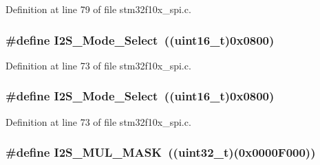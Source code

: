 Definition at line 79 of file stm32f10x\+\_\+spi.\+c.

\subsubsection[{\texorpdfstring{I2\+S\+\_\+\+Mode\+\_\+\+Select}{I2S_Mode_Select}}]{\setlength{\rightskip}{0pt plus 5cm}\#define I2\+S\+\_\+\+Mode\+\_\+\+Select~(({\bf uint16\+\_\+t})0x0800)}\hypertarget{group___s_p_i___private___defines_ga196b1b58421a7ee7dba0b46fb33c621b}{}\label{group___s_p_i___private___defines_ga196b1b58421a7ee7dba0b46fb33c621b}


Definition at line 73 of file stm32f10x\+\_\+spi.\+c.

\subsubsection[{\texorpdfstring{I2\+S\+\_\+\+Mode\+\_\+\+Select}{I2S_Mode_Select}}]{\setlength{\rightskip}{0pt plus 5cm}\#define I2\+S\+\_\+\+Mode\+\_\+\+Select~(({\bf uint16\+\_\+t})0x0800)}\hypertarget{group___s_p_i___private___defines_ga196b1b58421a7ee7dba0b46fb33c621b}{}\label{group___s_p_i___private___defines_ga196b1b58421a7ee7dba0b46fb33c621b}


Definition at line 73 of file stm32f10x\+\_\+spi.\+c.

\subsubsection[{\texorpdfstring{I2\+S\+\_\+\+M\+U\+L\+\_\+\+M\+A\+SK}{I2S_MUL_MASK}}]{\setlength{\rightskip}{0pt plus 5cm}\#define I2\+S\+\_\+\+M\+U\+L\+\_\+\+M\+A\+SK~(({\bf uint32\+\_\+t})(0x0000\+F000))}\hypertarget{group___s_p_i___private___defines_gaf9cca755995c8e8f7a4012709ca468f2}{}\label{group___s_p_i___private___defines_gaf9cca755995c8e8f7a4012709ca468f2}



